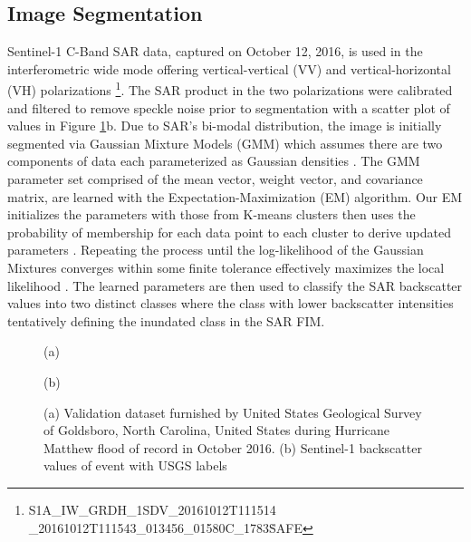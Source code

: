 \documentclass{article}
\begin{document}
\subsection{Image Segmentation}
\label{ssec:image_segmentation}
%
Sentinel-1 C-Band SAR data, captured on October 12, 2016, is used in the interferometric wide mode offering vertical-vertical (VV) and vertical-horizontal (VH) polarizations \cite{copernicus2016sentinel} \footnote{S1A\_IW\_GRDH\_1SDV\_20161012T111514 \_20161012T111543\_013456\_01580C\_1783\.SAFE}. 
The SAR product in the two polarizations were calibrated and filtered to remove speckle noise prior to segmentation \cite{zuhlke2015snap,yommy2015sar} with a scatter plot of values in Figure \ref{fig:validation_sar_labels}b. 
Due to SAR's bi-modal distribution, the image is initially segmented via Gaussian Mixture Models (GMM) which assumes there are two components of data each parameterized as Gaussian densities \cite{reynolds2009gaussian,mclachlan2004finite}.
The GMM parameter set comprised of the mean vector, weight vector, and covariance matrix, are learned with the Expectation-Maximization (EM) algorithm. 
Our EM initializes the parameters with those from K-means clusters then uses the probability of membership for each data point to each cluster to derive updated parameters \cite{barazandeh2018behavior,dempster1977maximum}. 
Repeating the process until the log-likelihood of the Gaussian Mixtures converges within some finite tolerance effectively maximizes the local likelihood \cite{barazandeh2018behavior,dempster1977maximum}.
The learned parameters are then used to classify the SAR backscatter values into two distinct classes where the class with lower backscatter intensities tentatively defining the inundated class in the SAR FIM.
% 
\begin{figure}[htb]
    \begin{minipage}[b]{.48\linewidth}
        \centering
        \centerline{}
        \centerline{(a)}\medskip
    \end{minipage}
    \hfill
    \begin{minipage}[b]{0.48\linewidth}
        \centering
        \centerline{}
        \centerline{(b)}\medskip
    \end{minipage}
    \caption{(a) Validation dataset furnished by United States Geological Survey of Goldsboro, North Carolina, United States during Hurricane Matthew flood of record in October 2016. (b) Sentinel-1 backscatter values of event with USGS labels}
    \label{fig:validation_sar_labels}
\end{figure}
%
\end{document}

